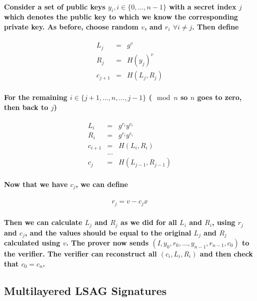 \documentclass{article}
\begin{document}
\paragraph{Consider a set of public keys $y_i, i \in \{0, …, n-1\}$ with a secret index $j$ which denotes the public key to which we know the corresponding private key.  As before, choose random $v$, and $r_i$ $\forall i \ne j$.  Then define}

\begin{eqnarray}
      L_j &=& g^v\\
      R_j &=& H(y_j)^v\\
  c_{j+1} &=& H(L_j,R_j)
\end{eqnarray}

\paragraph{For the remaining $i \in \{j+1, …, n, …, j-1\}$ ($\mod{n}$ so $n$ goes to zero, then back to $j$)}

\begin{eqnarray}
  L_i &=& g^{r_i} y^{c_i}\\
  R_i &=& g^{r_i} y^{c_i}\\
  c_{i+1} &=& H(L_i,R_i)\\
  &...& \\
  c_j &=& H(L_{j-1}, R_{j-1})
\end{eqnarray}

\paragraph{Now that we have $c_j$, we can define}

\begin{eqnarray}
  r_j = v - c_j x
\end{eqnarray}

\paragraph{Then we can calculate $L_j$ and $R_j$ as we did for all $L_i$ and $R_i$, using $r_j$ and $c_j$, and the values should be equal to the original $L_j$ and $R_j$ calculated using $v$. The prover now sends $(I, y_0, r_0, …, y_{n-1}, r_{n-1}, c_0)$ to the verifier.  The verifier can reconstruct all $(c_i, L_i, R_i)$ and then check that $c_0 = c_n$.}


\subsection{Multilayered LSAG Signatures}
\end{document}
